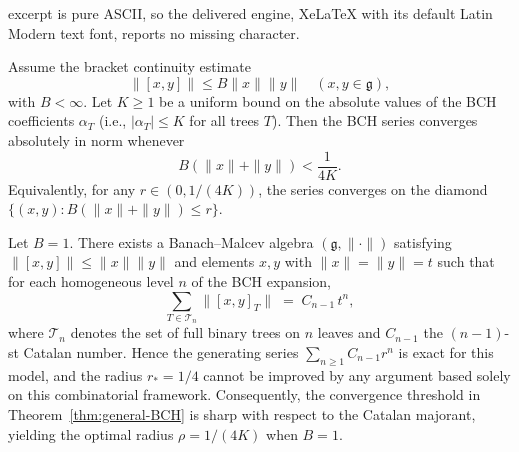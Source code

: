 \documentclass[10pt,a4paper]{amsart}
\begin{document}
excerpt is pure ASCII, so the delivered engine, XeLaTeX with its default Latin Modern text font, reports no missing character.
\begin{theorem}\label{thm:general-BCH}
Assume the bracket continuity estimate
\[
\|[x, y]\| \leq B \|x\| \|y\| \quad (x, y \in \mathfrak{g}),
\]
with $B < \infty$. Let $K \geq 1$ be a uniform bound on the absolute values of the BCH coefficients $\alpha_T$ (i.e., $|\alpha_T| \leq K$ for all trees $T$). Then the BCH series converges absolutely in norm whenever
\[
B(\|x\| + \|y\|) < \frac{1}{4K}.
\]
Equivalently, for any $r \in (0, 1/(4K))$, the series converges on the diamond $\{(x, y): B(\|x\| + \|y\|) \leq r\}$.
\end{theorem}

\begin{proposition}
\label{prop:sharpness-general}
Let $B=1$. There exists a Banach--Malcev algebra $(\mathfrak g,\|\cdot\|)$
satisfying $\|[x,y]\|\le\|x\|\|y\|$
and elements $x,y$ with $\|x\|=\|y\|=t$
such that for each homogeneous level $n$ of the BCH expansion,
\[
\sum_{T\in\mathcal T_n}\big\|[x,y]_T\big\|
\;=\; C_{n-1}\,t^n,
\]
where $\mathcal T_n$ denotes the set of full binary trees on $n$ leaves
and $C_{n-1}$ the $(n-1)$-st Catalan number.
Hence the generating series $\sum_{n\ge1}C_{n-1}r^n$
is exact for this model, and the radius $r_\ast=1/4$
cannot be improved by any argument based solely on this combinatorial framework.
Consequently, the convergence threshold in Theorem~\ref{thm:general-BCH} is sharp with respect to the Catalan majorant, yielding the optimal radius $\rho = 1/(4K)$ when $B=1$.
\end{proposition}
\end{document}
